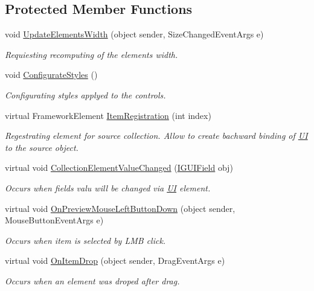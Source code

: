 \subsection*{Protected Member Functions}
\begin{DoxyCompactItemize}
\item 
void \mbox{\hyperlink{class_wpf_handler_1_1_u_i_1_1_controls_1_1_collection_control_a6df510adc9706b127f2179a6cc123799}{Update\+Elements\+Width}} (object sender, Size\+Changed\+Event\+Args e)
\begin{DoxyCompactList}\small\item\em Requiesting recomputing of the elements width. \end{DoxyCompactList}\item 
void \mbox{\hyperlink{class_wpf_handler_1_1_u_i_1_1_controls_1_1_collection_control_a5fdb64f8a451f387f2a36686f0fec014}{Configurate\+Styles}} ()
\begin{DoxyCompactList}\small\item\em Configurating styles applyed to the controls. \end{DoxyCompactList}\item 
virtual Framework\+Element \mbox{\hyperlink{class_wpf_handler_1_1_u_i_1_1_controls_1_1_collection_control_af375cbcb4d351b4d104b2706d39b8303}{Item\+Registration}} (int index)
\begin{DoxyCompactList}\small\item\em Regestrating element for source collection. Allow to create bachward binding of \mbox{\hyperlink{namespace_wpf_handler_1_1_u_i}{UI}} to the source object. \end{DoxyCompactList}\item 
virtual void \mbox{\hyperlink{class_wpf_handler_1_1_u_i_1_1_controls_1_1_collection_control_a2372fa8b10c175bb81d5901f36cbf8f7}{Collection\+Element\+Value\+Changed}} (\mbox{\hyperlink{interface_wpf_handler_1_1_u_i_1_1_auto_layout_1_1_i_g_u_i_field}{I\+G\+U\+I\+Field}} obj)
\begin{DoxyCompactList}\small\item\em Occurs when field\textquotesingle{}s valu will be changed via \mbox{\hyperlink{namespace_wpf_handler_1_1_u_i}{UI}} element. \end{DoxyCompactList}\item 
virtual void \mbox{\hyperlink{class_wpf_handler_1_1_u_i_1_1_controls_1_1_collection_control_ad6c991f82c204e789f32f21d28d48524}{On\+Preview\+Mouse\+Left\+Button\+Down}} (object sender, Mouse\+Button\+Event\+Args e)
\begin{DoxyCompactList}\small\item\em Occurs when item is selected by L\+MB click. \end{DoxyCompactList}\item 
virtual void \mbox{\hyperlink{class_wpf_handler_1_1_u_i_1_1_controls_1_1_collection_control_ae52c8e47654ca10e714a1e87a193331b}{On\+Item\+Drop}} (object sender, Drag\+Event\+Args e)
\begin{DoxyCompactList}\small\item\em Occurs when an element was droped after drag. \end{DoxyCompactList}\end{DoxyCompactItemize}
